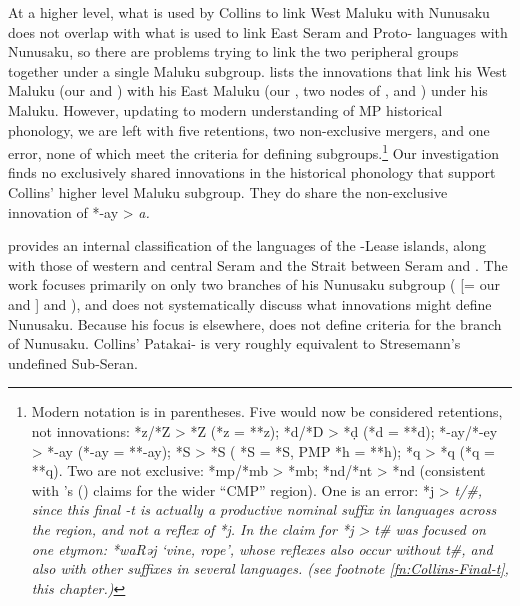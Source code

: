 At a higher level,
what is used by Collins to link West  Maluku with Nunusaku
does not overlap with what is used to link East Seram
and Proto- languages with Nunusaku,
so there are problems trying to link the two peripheral groups
together under a single  Maluku subgroup.
\citet[40]{Collins1981} lists the innovations that link his West
 Maluku (our 
and ) with his East  Maluku (our ,
two nodes of ,
and ) under his  Maluku.
However, updating to modern understanding of MP historical phonology,
we are left with five retentions,
two non-exclusive mergers, and one error,
none of which meet the criteria for defining subgroups.\footnote{
		Modern notation is in parentheses.
		Five would now be considered retentions,
		not innovations: *z/*Z > *Z (*z = **z); *d/*D > *ḍ (*d = **d);
		*-ay/*-ey > *-ay (*-ay = **-ay); *S > *S ( *S = *S,
		PMP *h = **h); *q > *q (*q = **q).
		Two are not exclusive: *mp/*mb > *mb; *nd/*nt > *nd (consistent
		with \citeauthor{Blust1981}'s (\citeyear[26]{Blust1981})
		claims for the wider “CMP” region).
		One is an error: *j > \it{t}/{\gap}{\#},
		since this final \it{-t} is actually a productive nominal suffix
		in languages across the region,
		and not a reflex of *j.
		In \citet{Collins1981,Collins1983} the claim for *j > \it{t}{\gap}{\#} was
		focused on one etymon: *waRəj ‘vine,
		rope’, whose reflexes also occur without \it{t}{\#},
		and also with other suffixes in several languages.
		(see footnote \ref{fn:Collins-Final-t}, this chapter.)}
Our investigation finds no
exclusively shared innovations in the historical phonology that
support Collins’ higher level  Maluku subgroup.
They do share the non-exclusive innovation of *-ay > \it{a}.

\citet{Collins1983} provides an internal classification of the
languages of the -Lease islands,
along with those of western
and central Seram and the  Strait between Seram and .
The \citeyear{Collins1983} work focuses primarily on only two branches of his Nunusaku
subgroup ( [= our  and ] and ),
and does not systematically discuss what innovations might define Nunusaku.
Because his focus is elsewhere,
\citet{Collins1983} does not define criteria
for the  branch of Nunusaku.
Collins’ Patakai- is very roughly equivalent to Stresemann’s
undefined Sub-Seran.